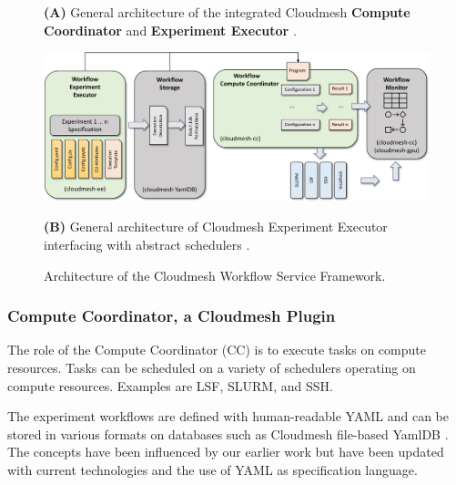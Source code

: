 \documentclass[sigconf]{acmart}
\begin{document}
\begin{figure}[htb]
{    {\bf (A)} General architecture of the integrated Cloudmesh {\bf Compute Coordinator} and {\bf Experiment Executor} \citep{las-frontiers-edu}.

\bigskip\bigskip
    
    \centering\includegraphics[width=1.0\columnwidth]{images/cloudmesh-ee-new}
    
    
    {\bf (B)} General architecture of Cloudmesh Experiment Executor interfacing with abstract schedulers \citep{las-frontiers-edu}.
  }

  
  
    \caption{Architecture of the Cloudmesh Workflow Service Framework.}
    \label{fig:cc-2}

\end{figure}


 
\subsubsection{Compute Coordinator, a Cloudmesh Plugin}
\label{sec:workflow-cc}

The role of the Compute Coordinator (CC) is to execute tasks on compute resources. Tasks can be scheduled on a variety of schedulers operating on compute resources. Examples are LSF, SLURM, and SSH.

The experiment workflows are defined with human-readable YAML and can be stored in various formats on databases such as Cloudmesh file-based YamlDB \citep{yamldb}. The concepts have been influenced by our earlier work \cite{las-94-ecwmf} but have been updated with current technologies and the use of YAML as specification language.
\end{document}

